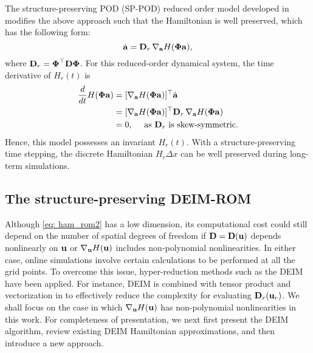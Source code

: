 \documentclass[11pt]{article}
\begin{document}
The structure-preserving POD (SP-POD) reduced order model developed in \cite{gong2017structure} modifies the above approach such that the Hamiltonian is well preserved, which has the following form: 
\begin{equation}
\dot{{{\bf a}}} = {\bf D}_r\, \nabla_{{\bf a}} H(\boldsymbol{\Phi} {{\bf a}}),
\label{eq: ham_rom2}
\end{equation}
where 
$
{\bf D}_r = \boldsymbol{\Phi}^\top {\bf D} \boldsymbol{\Phi} 
$. 
For this reduced-order dynamical system, the time derivative of $H_r(t)$ is
\begin{equation}
	\begin{aligned}
	\frac{d}{dt}H(\boldsymbol{\Phi}  {{\bf a}})&=[\nabla_{ {{\bf a}}} H(\boldsymbol{\Phi} {{\bf a}})]^\top \dot{ {{\bf a}}} \nonumber \\
				  &=[\nabla_{ {{\bf a}}} H(\boldsymbol{\Phi}  {{\bf a}})]^\top {\bf D}_r\, \nabla_{{\bf a}} H(\boldsymbol{\Phi}  {{\bf a}}) \nonumber \\
				  &= 0,\quad \text{ as ${\bf D}_r$ is skew-symmetric.}
	\end{aligned}
\label{eq: dHdt}	
\end{equation}
Hence, this model possesses an invariant $H_r(t)$. With a structure-preserving time stepping, the discrete Hamiltonian $H_r \Delta x$ can be well preserved during long-term simulations.  


\subsection{The structure-preserving DEIM-ROM}\label{sec: sp_deim1}


Although \eqref{eq: ham_rom2} has a low dimension, its computational cost could still depend on the number of spatial degrees of freedom if ${\bf D}= {\bf D}({\bf u})$ depends nonlinearly on ${\bf u}$ or $\nabla_{{\bf u}} H({\bf u})$ includes non-polynomial nonlinearities. In either case, online simulations involve certain calculations to be performed at all the grid points. 
To overcome this issue, hyper-reduction methods such as the DEIM have been applied. 
For instance, DEIM is combined with tensor product and vectorization in \cite{miyatake2019structure} to effectively reduce the complexity for evaluating ${\bf D}_r({\bf u}_r)$. 
We shall focus on the case in which $\nabla_{{\bf u}} H({\bf u})$ has non-polynomial nonlinearities in this work. 
For completeness of presentation, we next first present the DEIM algorithm, review existing DEIM Hamiltonian approximations, and then introduce a new approach.    
\end{document}
